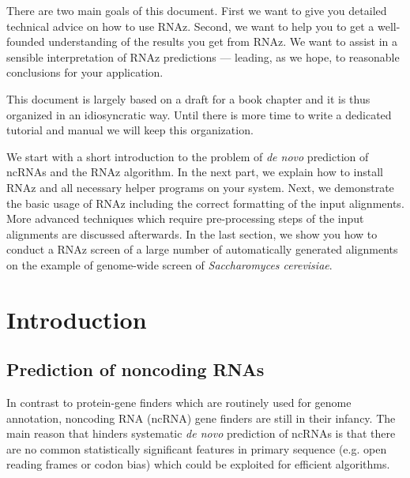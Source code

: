 \documentclass[11pt]{article}
\begin{document}
There are two main goals of this document. First we want to give you
detailed technical advice on how to use RNAz. Second, we want to help you
to get a well-founded understanding of the results you get from RNAz. We
want to assist in a sensible interpretation of RNAz predictions ---
leading, as we hope, to reasonable conclusions for your application.

This document is largely based on a draft for a book chapter and it is thus
organized in an idiosyncratic way. Until there is more time to write a
dedicated tutorial and manual we will keep this organization.

We start with a short introduction to the problem of \emph{de novo}
prediction of ncRNAs and the RNAz algorithm. In the next part, we explain
how to install RNAz and all necessary helper programs on your system. Next,
we demonstrate the basic usage of RNAz including the correct formatting of
the input alignments. More advanced techniques which require pre-processing
steps of the input alignments are discussed afterwards. In the last
section, we show you how to conduct a RNAz screen of a large number of
automatically generated alignments on the example of genome-wide screen of
\emph{Saccharomyces cerevisiae}.


\newpage


\section{Introduction}

\subsection{Prediction of noncoding RNAs}

In contrast to protein-gene finders which are routinely used for genome
annotation, noncoding RNA (ncRNA) gene finders are still in their infancy.
The main reason that hinders systematic \emph{de novo} prediction of ncRNAs
is that there are no common statistically significant features in primary
sequence (e.g. open reading frames or codon bias) which could be exploited
for efficient algorithms.
\end{document}
